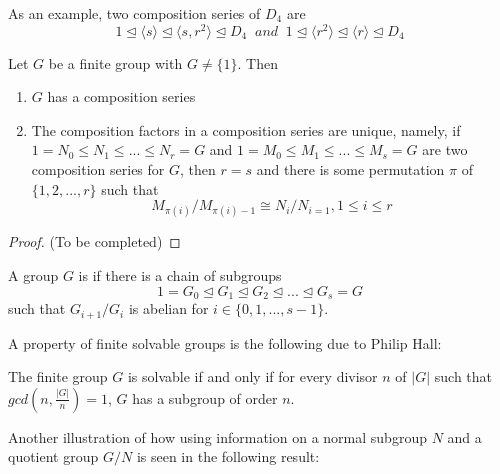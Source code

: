 \documentclass[12pt, a4paper, oneside, openright, titlepage]{book}
\begin{document}
As an example, two composition series of $D_4$ are \begin{equation*}
    1\trianglelefteq \langle s \rangle \trianglelefteq \langle s,r^2\rangle \trianglelefteq D_4\;\;and\;\;1 \trianglelefteq \langle r^2\rangle \trianglelefteq \langle r \rangle \trianglelefteq D_4
\end{equation*}


\begin{namthm}\label{thmname:JHseries}
    Let $G$ be a finite group with $G \neq \{1\}$. Then \begin{enumerate}
        \item $G$ has a composition series
        \item The composition factors in a composition series are unique, namely, if $1 = N_0 \leq N_1 \leq ... \leq N_r = G$ and $1 = M_0 \leq M_1 \leq ... \leq M_s = G$ are two composition series for $G$, then $r = s$ and there is some permutation $\pi$ of $\{1,2,...,r\}$ such that \begin{equation*}
                M_{\pi(i)}/M_{\pi(i)-1}\cong N_i/N_{i=1}, 1 \leq i \leq r
        \end{equation*}
    \end{enumerate}
\end{namthm}
\begin{proof}
    (To be completed)
\end{proof}


\begin{defn}
    A group $G$ is  if there is a chain of subgroups \begin{equation*}
        1 = G_0 \trianglelefteq G_1 \trianglelefteq G_2 \trianglelefteq ... \trianglelefteq G_s = G
    \end{equation*}
    such that $G_{i+1}/G_i$ is abelian for $i \in \{0,1,...,s-1\}$.
\end{defn}

A property of finite solvable groups is the following due to Philip Hall: 

\begin{thm}
    The finite group $G$ is solvable if and only if for every divisor $n$ of $|G|$ such that $gcd\left(n,\frac{|G|}{n}\right) = 1$, $G$ has a subgroup of order $n$.
\end{thm}

Another illustration of how using information on a normal subgroup $N$ and a quotient group $G/N$ is seen in the following result:
\end{document}
